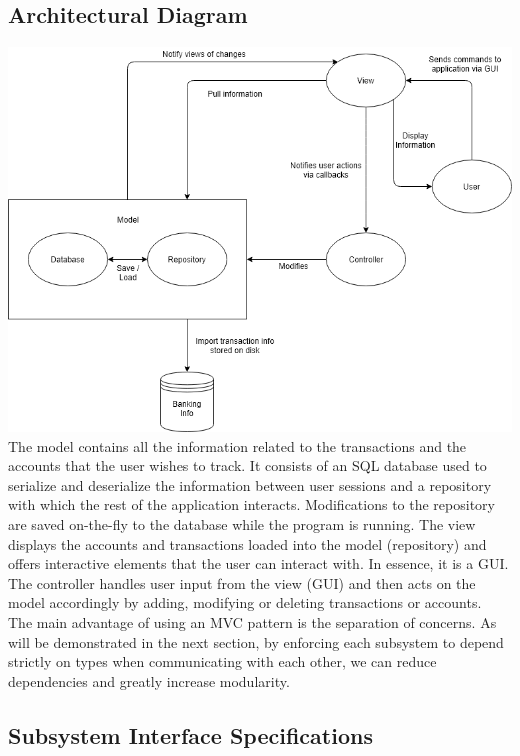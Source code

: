 \documentclass[12pt]{article}
\begin{document}
\subsection{Architectural Diagram}

\includegraphics[width=\textwidth,height=\textheight,keepaspectratio]{diagrams/UML/MVC.png}
\bigskip
The model contains all the information related to the transactions and the accounts that the user wishes to track. It consists of an SQL database used to serialize and deserialize   the information between user sessions and a repository with which the rest of the application interacts. Modifications to the repository are saved on-the-fly to the database while the program is running. The view displays the accounts and transactions loaded into the model (repository) and offers interactive elements that the user can interact with. In essence, it is a GUI. The controller handles user input from the view (GUI) and then acts on the model accordingly by adding, modifying or deleting transactions or accounts.\\

The main advantage of using an MVC pattern is the separation of concerns. As will be demonstrated in the next section, by enforcing each subsystem to depend strictly on  types when communicating with each other, we can reduce dependencies and greatly increase modularity.



\subsection{Subsystem Interface Specifications}
\end{document}
